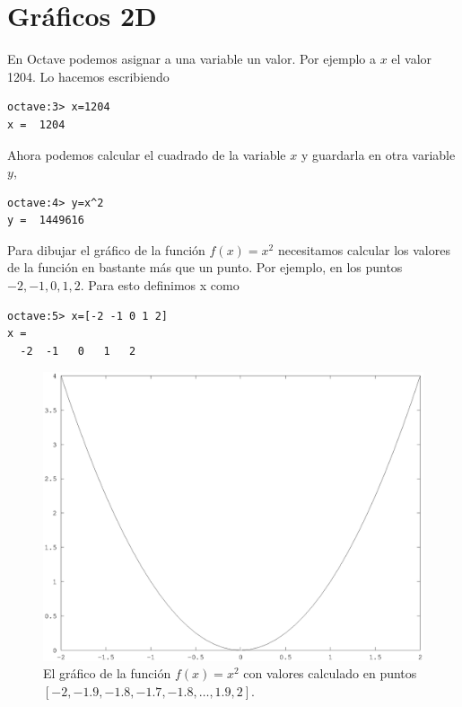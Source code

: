 \section{Gráficos 2D}

En Octave podemos asignar a una variable un valor. Por ejemplo a $x$
el valor 1204. Lo hacemos escribiendo
\begin{octavebox}
\begin{verbatim}
octave:3> x=1204
x =  1204
\end{verbatim}
\end{octavebox}


Ahora podemos calcular el cuadrado de la variable $x$ y guardarla en
otra variable $y$,
\begin{octavebox}
  \begin{verbatim}
octave:4> y=x^2
y =  1449616
\end{verbatim}
\end{octavebox}

Para dibujar el gráfico de la función $f(x)=x^2$ necesitamos calcular
los valores de la función en bastante más que un punto. Por ejemplo, en
los puntos $-2,-1,0,1,2$. Para esto definimos x como
\begin{octavebox}
\begin{verbatim}
octave:5> x=[-2 -1 0 1 2]
x =
  -2  -1   0   1   2
\end{verbatim}
\end{octavebox}

\begin{figure} 
      \vspace{-10pt}
  \begin{figurebox}
      \centering
\includegraphics[scale=.4]{fig2.eps}
\caption{El gráfico de la función $f(x)=x^2$ con valores calculado en
  puntos $[-2, -1.9, -1.8, -1.7, -1.8, \ldots ,1.9, 2]$.  }
\label{fig:2}
\end{figurebox}
\vspace{-150pt}
\end{figure}

